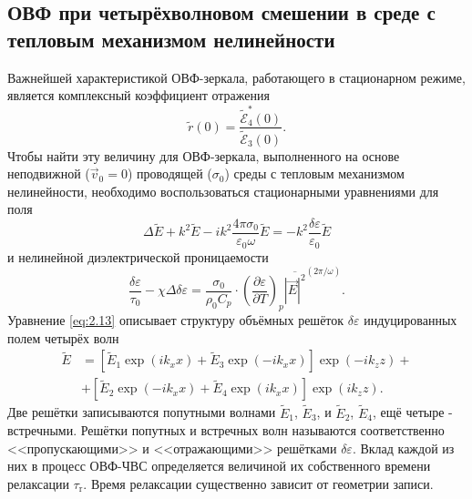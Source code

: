 \subsection{ОВФ при четырёхволновом смешении в среде с тепловым механизмом нелинейности}

Важнейшей характеристикой ОВФ-зеркала, работающего в стационар­ном режиме, является комплексный коэффициент отражения
\begin{equation}
	\label{eq:2.11}
	\tilde{r}(0)=\frac{\tilde{\mathcal{E}}_{4}^{*}(0)}{\tilde{\mathcal{E}}_{3}(0)}.
\end{equation}
Чтобы найти эту величину для ОВФ-зеркала, выполненного на основе неподвижной ($\vec{v}_0 = 0$) проводящей ($\sigma_0$) среды с тепловым механизмом нелинейности, необходимо воспользоваться стационарными уравнениями для поля
\begin{equation}
	\label{eq:2.12}
	\Delta \tilde{E}+k^{2} \tilde{E}-i k^{2} \frac{4 \pi \sigma_{0}}{\varepsilon_{0} \omega} \tilde{E}=-k^{2} \frac{\delta \varepsilon}{\varepsilon_{0}} \tilde{E}
\end{equation}
и нелинейной диэлектрической проницаемости
\begin{equation}
	\label{eq:2.13}
	\frac{\delta \varepsilon}{\tau_{0}}-\chi \Delta \delta \varepsilon=\frac{\sigma_{0}}{\rho_{0} C_{p}} \cdot\left(\frac{\partial \varepsilon}{\partial T}\right)_{p} \overline{|\vec{E}|^{2}}^{(2\pi/\omega)}.
\end{equation}
Уравнение \eqref{eq:2.13} описывает структуру объёмных решёток $\delta \varepsilon$ индуцированных полем четырёх волн
\begin{equation}
	\label{eq:2.14}
	\begin{aligned}
	\tilde{E} &=\left[\tilde{E}_{1} \exp \left(i k_{x} x\right)+\tilde{E}_{3} \exp \left(-i k_{x} x\right)\right] \exp \left(-i k_{z} z\right)+\\
	&+\left[\tilde{E}_{2} \exp \left(-i k_{x} x\right)+\tilde{E}_{4} \exp \left(i k_{x} x\right)\right] \exp \left(i k_{z} z\right).
	\end{aligned}
\end{equation}
Две решётки записываются попутными волнами $\tilde{E}_1$, $\tilde{E}_3$, и $\tilde{E}_2$, $\tilde{E}_4$, ещё четыре - встречными. Решётки попутных и встречных волн называются со­ответственно <<пропускающими>> и <<отражающими>> решётками $\delta \varepsilon$. Вклад каждой из них в процесс ОВФ-ЧВС определяется величиной их собственного времени релаксации $\tau_\text{r}$. Время релаксации существенно зависит от геометрии записи.
